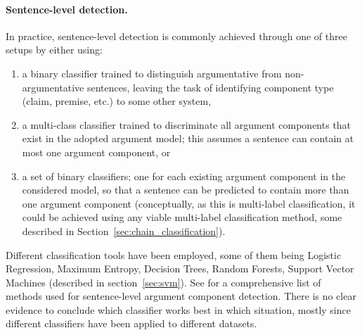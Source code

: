 \paragraph{Sentence-level detection.} 
In practice, sentence-level detection is commonly achieved through one of three
setups by either using:
\begin{enumerate}
\item a binary classifier trained to distinguish argumentative from 
	non-argumentative sentences, leaving the task of identifying component type
	(claim, premise, etc.) to some other system, 
\item a multi-class classifier trained to discriminate all argument components that
	exist in the adopted argument model; this assumes a sentence can contain at most
	one argument component, or 
\item a set of binary classifiers; one for each existing argument component in
	the considered model, so that a sentence can be predicted to contain
		more than one argument component (conceptually, as this is
		multi-label classification, it could be achieved using any
		viable multi-label classification method, some described in 
		Section~\ref{sec:chain_classification}).
\end{enumerate}
Different classification tools have been employed,  
some of them being Logistic Regression, Maximum Entropy, Decision
Trees, Random Forests, Support Vector Machines (described in section~\ref{sec:svm}).
See \citep{lippi2016argumentation} for a comprehensive list of methods used for 
sentence-level argument component detection.
There is no clear evidence to conclude which classifier works best 
in which situation, mostly since different classifiers have been applied
to different datasets. 

